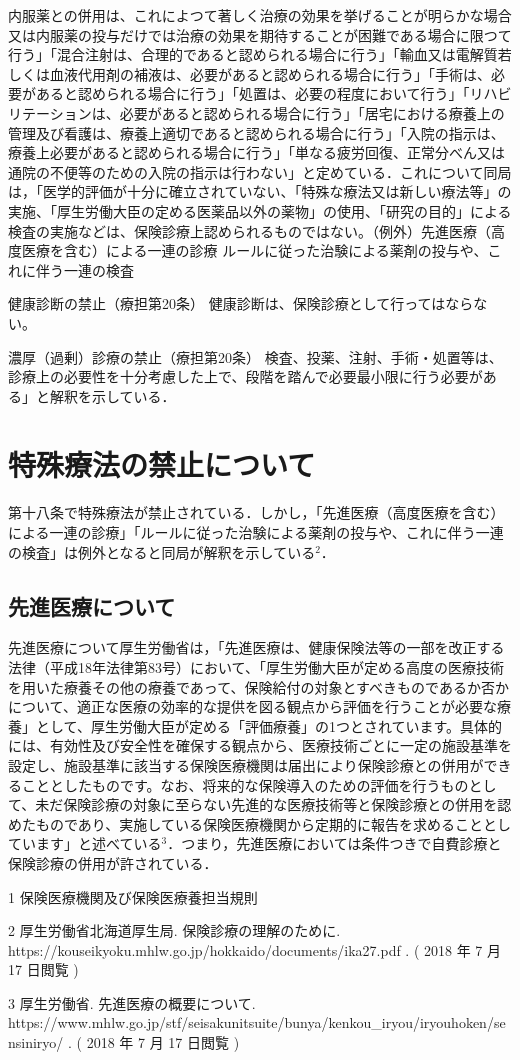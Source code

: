 \documentclass[11pt,dvipdfmx,uplatex]{jsarticle}
\begin{document}
内服薬との併用は、これによつて著しく治療の効果を挙げることが明らかな場合又は内服薬の投与だけでは治療の効果を期待することが困難である場合に限つて行う」「混合注射は、合理的であると認められる場合に行う」「輸血又は電解質若しくは血液代用剤の補液は、必要があると認められる場合に行う」「手術は、必要があると認められる場合に行う」「処置は、必要の程度において行う」「リハビリテーションは、必要があると認められる場合に行う」「居宅における療養上の管理及び看護は、療養上適切であると認められる場合に行う」「入院の指示は、療養上必要があると認められる場合に行う」「単なる疲労回復、正常分べん又は通院の不便等のための入院の指示は行わない」と定めている．これについて同局は，「医学的評価が十分に確立されていない、「特殊な療法又は新しい療法等」の実施、「厚生労働大臣の定める医薬品以外の薬物」の使用、「研究の目的」による検査の実施などは、保険診療上認められるものではない。（例外）先進医療（高度医療を含む）による一連の診療 ルールに従った治験による薬剤の投与や、これに伴う一連の検査
	
	健康診断の禁止（療担第20条）  健康診断は、保険診療として行ってはならない。
	
濃厚（過剰）診療の禁止（療担第20条）  検査、投薬、注射、手術・処置等は、診療上の必要性を十分考慮した上で、段階を踏んで必要最小限に行う必要がある」と解釈を示している．


\section{特殊療法の禁止について}

第十八条で特殊療法が禁止されている．しかし，「先進医療（高度医療を含む）による一連の診療」「ルールに従った治験による薬剤の投与や、これに伴う一連の検査」は例外となると同局が解釈を示している$^2$．

\subsection{先進医療について}

先進医療について厚生労働省は，「先進医療は、健康保険法等の一部を改正する法律（平成18年法律第83号）において、「厚生労働大臣が定める高度の医療技術を用いた療養その他の療養であって、保険給付の対象とすべきものであるか否かについて、適正な医療の効率的な提供を図る観点から評価を行うことが必要な療養」として、厚生労働大臣が定める「評価療養」の1つとされています。具体的には、有効性及び安全性を確保する観点から、医療技術ごとに一定の施設基準を設定し、施設基準に該当する保険医療機関は届出により保険診療との併用ができることとしたものです。なお、将来的な保険導入のための評価を行うものとして、未だ保険診療の対象に至らない先進的な医療技術等と保険診療との併用を認めたものであり、実施している保険医療機関から定期的に報告を求めることとしています」と述べている$^3$．つまり，先進医療においては条件つきで自費診療と保険診療の併用が許されている．


1 保険医療機関及び保険医療養担当規則

2 厚生労働省北海道厚生局. 保険診療の理解のために. https://kouseikyoku.mhlw.go.jp/hokkaido/documents/ika27.pdf . ( 2018 年 7 月 17 日閲覧 )

3 厚生労働省. 先進医療の概要について. https://www.mhlw.go.jp/stf/seisakunitsuite/bunya/kenkou_iryou/iryouhoken/sensiniryo/ . ( 2018 年 7 月 17 日閲覧 )
\end{document}

